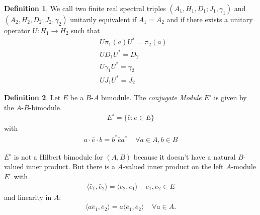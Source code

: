 \documentclass[a4paper]{article}
\theoremstyle{definition}
\newtheorem{definition}{Definition}
\theoremstyle{definition}
\theoremstyle{definition}
\theoremstyle{theorem}
\theoremstyle{theorem}
\begin{document}
\begin{definition}
    We call two finite real spectral triples $(A_1, H_1 ,D_1 ; J_1 , \gamma
    _1)$ and $(A_2, H_2, D_2; J_2, \gamma _2)$ unitarily equivalent if $A_1 =
    A_2$ and if there exists a unitary operator $U: H_1 \rightarrow H_2$ such
    that
    \begin{align}
        &U\pi_1(a) U^* = \pi _2(a)\\
        &UD_1U^*=D_2\\
        &U\gamma _1 U^* = \gamma _2\\
        &UJ_1 U^* = J_2
    \end{align}
\end{definition}
\begin{definition}
    Let $E$ be a $B$-$A$ bimodule. The \textit{conjugate Module} $E^\circ$ is
    given by the $A$-$B$-bimodule.
    \begin{align}
        E^\circ = \{\bar{e} : e\in E\}
    \end{align}
    with
    \begin{align}
    a \cdot \bar{e} \cdot b = b^* \bar{e} a^* \;\;\;\; \forall a\in A, b \in
        B
    \end{align}
\end{definition}
$E^\circ$ is not a Hilbert bimodule for $(A, B)$ because it doesn't have a
natural $B$-valued inner product. But there is a $A$-valued inner product on
the left $A$-module $E^\circ$ with
\begin{align}
    \langle \bar{e}_1, \bar{e}_2 \rangle = \langle e_2 , e_1 \rangle
    \;\;\;\; e_1, e_2 \in E
\end{align}
and linearity in $A$:
\begin{align}
    \langle a \bar{e}_1, \bar{e}_2 \rangle = a \langle \bar{e}_1, \bar{e}_2
    \rangle \;\;\;\; \forall a \in A.
\end{align}
\end{document}

